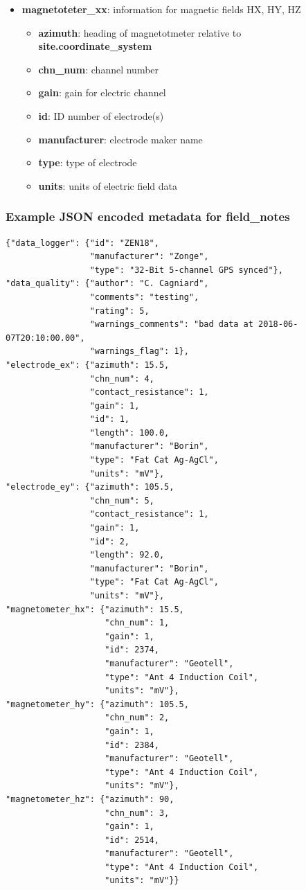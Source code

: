 \documentclass{article}
\newcommand{\attr}[1]{\textbf{#1}}
\begin{document}
\begin{itemize}
	\item \attr{magnetoteter\_xx}: information for magnetic fields HX, HY, HZ
	\begin{itemize}
		\setlength{\itemsep}{.05em}
		\item \attr{azimuth}: heading of magnetotmeter relative to \attr{site.coordinate\_system}
		\item \attr{chn\_num}: channel number 
		\item \attr{gain}: gain for electric channel
		\item \attr{id}: ID number of electrode(s)
		\item \attr{manufacturer}: electrode maker name
		\item \attr{type}: type of electrode
		\item \attr{units}: units of electric field data 
	\end{itemize}
\end{itemize}

\newpage
\subsubsection{Example JSON encoded metadata for \textbf{field\_notes}}
\begin{verbatim}
{"data_logger": {"id": "ZEN18",
                 "manufacturer": "Zonge",
                 "type": "32-Bit 5-channel GPS synced"},
"data_quality": {"author": "C. Cagniard",
                 "comments": "testing",
                 "rating": 5,
                 "warnings_comments": "bad data at 2018-06-07T20:10:00.00",
                 "warnings_flag": 1},
"electrode_ex": {"azimuth": 15.5,
                 "chn_num": 4,
                 "contact_resistance": 1,
                 "gain": 1,
                 "id": 1,
                 "length": 100.0,
                 "manufacturer": "Borin",
                 "type": "Fat Cat Ag-AgCl",
                 "units": "mV"},
"electrode_ey": {"azimuth": 105.5,
                 "chn_num": 5,
                 "contact_resistance": 1,
                 "gain": 1,
                 "id": 2,
                 "length": 92.0,
                 "manufacturer": "Borin",
                 "type": "Fat Cat Ag-AgCl",
                 "units": "mV"},
"magnetometer_hx": {"azimuth": 15.5,
                    "chn_num": 1,
                    "gain": 1,
                    "id": 2374,
                    "manufacturer": "Geotell",
                    "type": "Ant 4 Induction Coil",
                    "units": "mV"},
"magnetometer_hy": {"azimuth": 105.5,
                    "chn_num": 2,
                    "gain": 1,
                    "id": 2384,
                    "manufacturer": "Geotell",
                    "type": "Ant 4 Induction Coil",
                    "units": "mV"},
"magnetometer_hz": {"azimuth": 90,
                    "chn_num": 3,
                    "gain": 1,
                    "id": 2514,
                    "manufacturer": "Geotell",
                    "type": "Ant 4 Induction Coil",
                    "units": "mV"}}
\end{verbatim}
\end{document}
